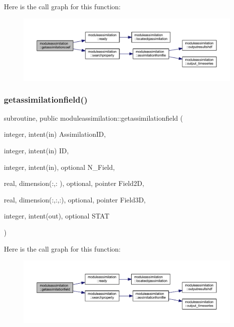 Here is the call graph for this function\+:\nopagebreak
\begin{figure}[H]
\begin{center}
\leavevmode
\includegraphics[width=350pt]{namespacemoduleassimilation_aeb67db12f57e948ab0d21c07cf0f3ee4_cgraph}
\end{center}
\end{figure}
\mbox{\label{namespacemoduleassimilation_aa6ac00eae8c819e287924553d8d10638}} 
\subsubsection{\texorpdfstring{getassimilationfield()}{getassimilationfield()}}
{\footnotesize\ttfamily subroutine, public moduleassimilation\+::getassimilationfield (\begin{DoxyParamCaption}\item[{integer, intent(in)}]{Assimilation\+ID,  }\item[{integer, intent(in)}]{ID,  }\item[{integer, intent(in), optional}]{N\+\_\+\+Field,  }\item[{real, dimension(\+:,\+:  ), optional, pointer}]{Field2D,  }\item[{real, dimension(\+:,\+:,\+:), optional, pointer}]{Field3D,  }\item[{integer, intent(out), optional}]{S\+T\+AT }\end{DoxyParamCaption})}

Here is the call graph for this function\+:\nopagebreak
\begin{figure}[H]
\begin{center}
\leavevmode
\includegraphics[width=350pt]{namespacemoduleassimilation_aa6ac00eae8c819e287924553d8d10638_cgraph}
\end{center}
\end{figure}
\mbox{\label{namespacemoduleassimilation_a9dcf23578dc00d565791f0b2ce1edc7d}} 
